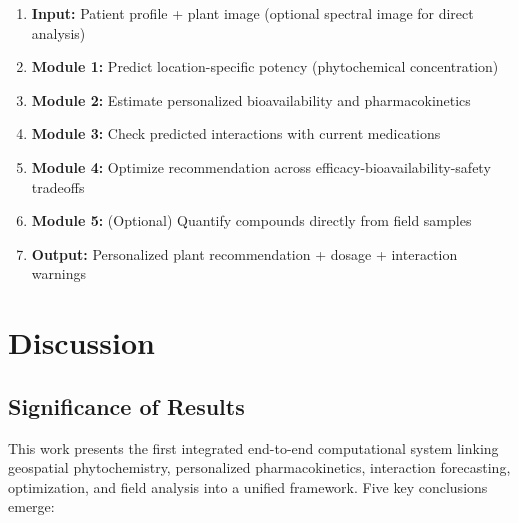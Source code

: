 \documentclass[11pt,a4paper]{article}
\begin{document}
\begin{enumerate}
    \item \textbf{Input:} Patient profile + plant image (optional spectral image for direct analysis)
    \item \textbf{Module 1:} Predict location-specific potency (phytochemical concentration)
    \item \textbf{Module 2:} Estimate personalized bioavailability and pharmacokinetics
    \item \textbf{Module 3:} Check predicted interactions with current medications
    \item \textbf{Module 4:} Optimize recommendation across efficacy-bioavailability-safety tradeoffs
    \item \textbf{Module 5:} (Optional) Quantify compounds directly from field samples
    \item \textbf{Output:} Personalized plant recommendation + dosage + interaction warnings
\end{enumerate}

\section{Discussion}

\subsection{Significance of Results}

This work presents the first integrated end-to-end computational system linking geospatial phytochemistry, personalized pharmacokinetics, interaction forecasting, optimization, and field analysis into a unified framework. Five key conclusions emerge:
\end{document}

